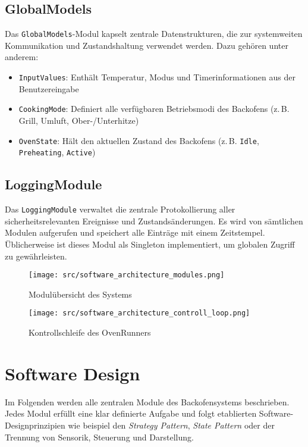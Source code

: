 \documentclass[a4paper,12pt]{article}
\begin{document}
\subsection*{GlobalModels}
Das \texttt{GlobalModels}-Modul kapselt zentrale Datenstrukturen, die zur systemweiten Kommunikation und Zustandshaltung verwendet werden. Dazu gehören unter anderem:
\begin{itemize}
    \item \texttt{InputValues}: Enthält Temperatur, Modus und Timerinformationen aus der Benutzereingabe
    \item \texttt{CookingMode}: Definiert alle verfügbaren Betriebsmodi des Backofens (z.\,B. Grill, Umluft, Ober-/Unterhitze)
    \item \texttt{OvenState}: Hält den aktuellen Zustand des Backofens (z.\,B. \texttt{Idle}, \texttt{Preheating}, \texttt{Active})
\end{itemize}

\subsection*{LoggingModule}
Das \texttt{LoggingModule} verwaltet die zentrale Protokollierung aller sicherheitsrelevanten Ereignisse und Zustandsänderungen. Es wird von sämtlichen Modulen aufgerufen und speichert alle Einträge mit einem Zeitstempel. Üblicherweise ist dieses Modul als Singleton implementiert, um globalen Zugriff zu gewährleisten.

\clearpage

\begin{figure}[h!]
  \centering
  \texttt{[image: src/software\_architecture\_modules.png]}
  \caption{Modulübersicht des Systems}
  \label{fig:moduluebersicht}
\end{figure}

\begin{figure}[h!]
  \centering
  \texttt{[image: src/software\_architecture\_controll\_loop.png]}
  \caption{Kontrollschleife des OvenRunners}
  \label{fig:controllloop}
\end{figure}

\clearpage


\section{Software Design}

Im Folgenden werden alle zentralen Module des Backofensystems beschrieben. Jedes Modul erfüllt eine klar definierte Aufgabe und folgt etablierten Software-Designprinzipien wie beispiel den \textit{Strategy Pattern}, \textit{State Pattern} oder der Trennung von Sensorik, Steuerung und Darstellung.
\end{document}
